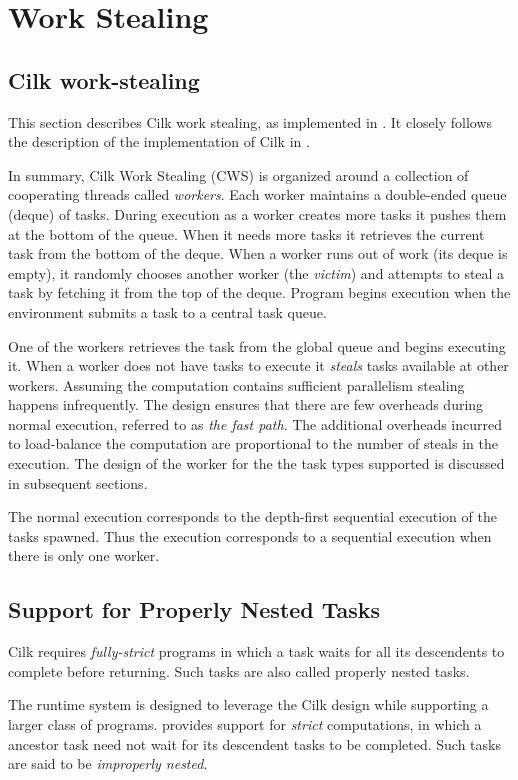\section{\Xten{} Work Stealing}\label{sec:XWS}
\subsection{Cilk work-stealing}
This section describes Cilk work stealing, as implemented in \XWS. It
closely follows the description of the implementation of Cilk in
\cite{frigo98implementation}.

In summary, Cilk Work Stealing (CWS) is organized around a collection
of cooperating threads called {\em workers}. Each worker maintains a
double-ended queue (deque) of tasks. During execution as a worker
creates more tasks it pushes them at the bottom of the queue. When it
needs more tasks it retrieves the current task from the bottom of the
deque. When a worker runs out of work (its deque is empty), it
randomly chooses another worker (the {\em victim}) and attempts to
steal a task by fetching it from the top of the deque. Program begins
execution when the environment submits a task to a central task queue.

One of the workers retrieves the task from the global queue and begins
executing it. When a worker does not have tasks to execute it {\em steals}
tasks available at other workers. Assuming the computation contains
sufficient parallelism stealing happens infrequently. The design
ensures that there are few overheads during normal execution, referred
to as {\em the fast path}. The additional overheads incurred to load-balance
the computation are proportional to the number of steals in the
execution. The design of the worker for the the task types supported
is discussed in subsequent sections.

The normal execution corresponds to the depth-first sequential
execution of the tasks spawned. Thus the execution corresponds to a
sequential execution when there is only one worker.

\subsection{Support for Properly Nested Tasks}
Cilk requires {\em fully-strict} programs
in which a task waits for all its descendents to complete before
returning. Such tasks are also called properly nested tasks. 

The \Xten{} runtime system is designed to leverage the Cilk design while
supporting a larger class of programs. \Xten{} provides support for {\em
strict} computations, in which a ancestor task need not wait for its
descendent tasks to be completed. Such tasks are said to be {\em improperly
nested}. 

